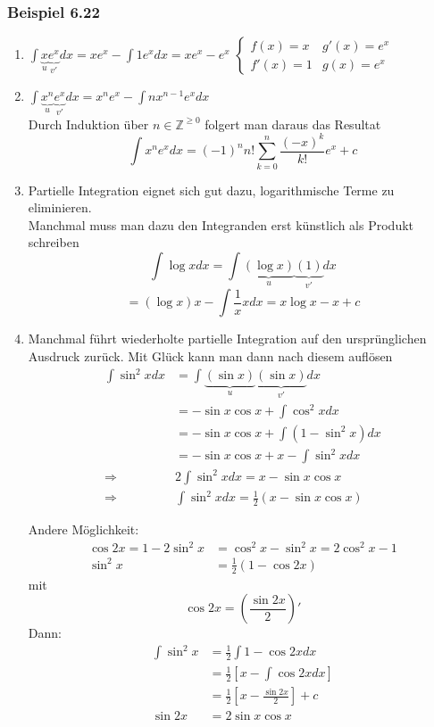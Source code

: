 \subsubsection*{Beispiel 6.22}
\begin{enumerate}
\item $\int {\underbrace x_u\underbrace {{e^x}}_{v'}dx = x{e^x} - \int {1{e^x}dx} } =x e^x - e^x$
$\left\{\begin{array}{cc} f(x)=x & g'(x)=e^x \\ f'(x)=1 & g(x)=e^x\end{array}\right.$

\item $\int {\underbrace {{x^n}}_u\underbrace {{e^x}}_{v'}dx = {x^n}{e^x} - \int {n{x^{n - 1}}{e^x}dx} } $\\
Durch Induktion über $n\in\mathbb{Z}^{\geq 0}$ folgert man daraus das Resultat \[\int {{x^n}{e^x}dx = {{( - 1)}^n}n!\sum\limits_{k = 0}^n {\frac{{{{( - x)}^k}}}{{k!}}{e^x} + c} } \]

\item Partielle Integration eignet sich gut dazu, logarithmische Terme zu eliminieren.\\
Manchmal muss man dazu den Integranden erst künstlich als Produkt schreiben
\[\int {\log xdx = \int {\underbrace {(\log x)}_u\underbrace {(1)}_{v'}dx} } \]
\[ = (\log x)x - \int {\frac{1}{x}} xdx = x\log x - x + c\]

\item Manchmal führt wiederholte partielle Integration auf den ursprünglichen Ausdruck zurück. Mit Glück kann man dann nach diesem auflösen
\begin{align*}
\int {{{\sin }^2}xdx} &=\int {\underbrace {(\sin x)}_u\underbrace {(\sin x)}_{v'}dx}  \\
 &=- \sin x\cos x + \int {{{\cos }^2}xdx}\\
 &=- \sin x\cos x + \int {(1 - {{\sin }^2}x)dx}\\
 &=- \sin x\cos x + x - \int {{{\sin }^2}xdx} \\
\Rightarrow&2\int {{{\sin }^2}xdx = x - \sin x\cos x} \\
\Rightarrow&\int {{{\sin }^2}xdx = \frac{1}{2}\left( {x - \sin x\cos x}  \right)}
\end{align*}


Andere Möglichkeit:
\begin{align*}
\cos 2x = 1-2\sin^2x&=\cos^2x-\sin^2x=2\cos^2x-1\\
\sin^2x&=\frac{1}{2}(1-\cos 2x)
\end{align*}
mit
\[\cos 2x=\left(\frac{\sin 2x}{2} \right)'\]
Dann:
\begin{align*}
\int{\sin^2 x}&=\frac{1}{2}\int{1-\cos 2x dx}\\
&=\frac{1}{2}\left[ x-\int{\cos 2x dx}\right]\\
&=\frac{1}{2}\left[ x-\frac{\sin 2x}{2}\right] +c\\
\sin 2x&=2\sin x\cos x
\end{align*}
\end{enumerate}

